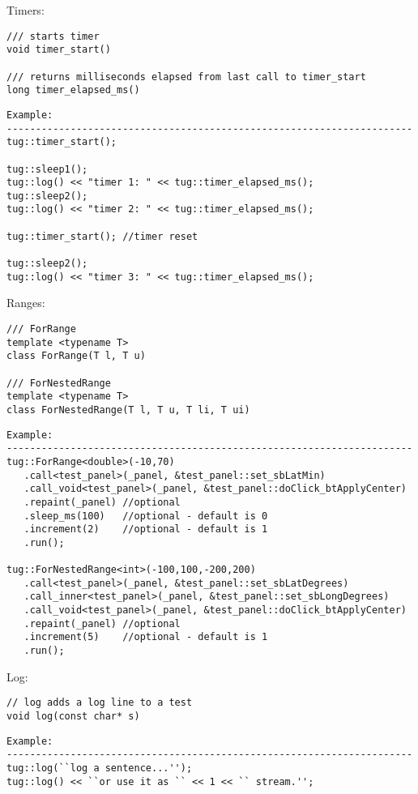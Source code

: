 Timers:
%
\begin{lstlisting}
/// starts timer
void timer_start()

/// returns milliseconds elapsed from last call to timer_start
long timer_elapsed_ms()
\end{lstlisting}

\begin{lstlisting}
Example:
----------------------------------------------------------------------
tug::timer_start();

tug::sleep1();
tug::log() << "timer 1: " << tug::timer_elapsed_ms();
tug::sleep2();
tug::log() << "timer 2: " << tug::timer_elapsed_ms();

tug::timer_start(); //timer reset

tug::sleep2();
tug::log() << "timer 3: " << tug::timer_elapsed_ms();
\end{lstlisting}


Ranges:
%
\begin{lstlisting}
/// ForRange
template <typename T>
class ForRange(T l, T u) 

/// ForNestedRange
template <typename T>
class ForNestedRange(T l, T u, T li, T ui)
\end{lstlisting}

\begin{lstlisting}
Example:
----------------------------------------------------------------------
tug::ForRange<double>(-10,70)
   .call<test_panel>(_panel, &test_panel::set_sbLatMin)
   .call_void<test_panel>(_panel, &test_panel::doClick_btApplyCenter)
   .repaint(_panel) //optional
   .sleep_ms(100)   //optional - default is 0
   .increment(2)    //optional - default is 1
   .run();

tug::ForNestedRange<int>(-100,100,-200,200)
   .call<test_panel>(_panel, &test_panel::set_sbLatDegrees)
   .call_inner<test_panel>(_panel, &test_panel::set_sbLongDegrees)
   .call_void<test_panel>(_panel, &test_panel::doClick_btApplyCenter)
   .repaint(_panel) //optional
   .increment(5)    //optional - default is 1
   .run();
\end{lstlisting}


Log:
%
\begin{lstlisting}
// log adds a log line to a test
void log(const char* s)
\end{lstlisting}

\begin{lstlisting}
Example:
----------------------------------------------------------------------
tug::log(``log a sentence...'');
tug::log() << ``or use it as `` << 1 << `` stream.'';
\end{lstlisting}


